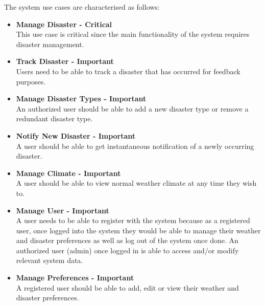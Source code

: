 The system use cases are characterised as follows:
 \begin{itemize}

 	\item \textbf{Manage Disaster - Critical}\\ This use case is critical since the main functionality of the system requires disaster management.
 	\item \textbf{Track Disaster - Important}\\ Users need to be able to track a disaster that has occurred for feedback purposes. 
 	\item \textbf{Manage Disaster Types - Important}\\ An authorized user should be able to add a new disaster type or remove a redundant disaster type.
 	\item \textbf{Notify New Disaster - Important}\\ A user should be able to get instantaneous notification of a newly occurring disaster.
 	\item \textbf{Manage Climate - Important}\\ A user should be able to view normal weather climate at any time they wish to.
 	\item \textbf{Manage User - Important} \\ A user needs to be able to register with the system because as a registered user, once logged into the system they would be able to manage their weather and disaster preferences as well as log out of the system once done. An authorized user (admin) once logged in is able to access and/or modify relevant system data.
	\item \textbf{Manage Preferences - Important} \\ A registered user should be able to add, edit or view their weather and disaster preferences.  
 \end{itemize}